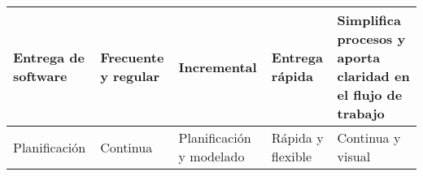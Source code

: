 \begin{longtable}{|p{3cm}|p{2.5cm}|p{2.5cm}|p{2.5cm}|p{2.5cm}|}
    Entrega de software                            & Frecuente y regular                                                                                    & Incremental                                                                                    & Entrega rápida                                                                             & Simplifica procesos y aporta claridad en el flujo de trabajo                            \\\hline
    Planificación                                  & Continua                                                                                               & Planificación y modelado                                                                       & Rápida y flexible                                                                          & Continua y visual                                                                       \\
\end{longtable}
